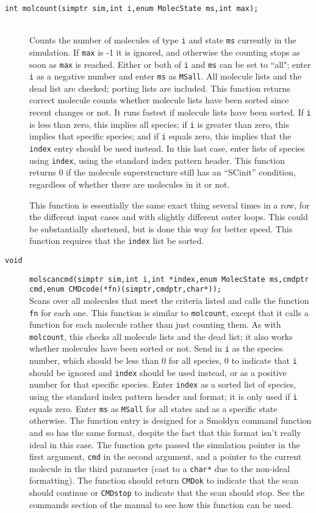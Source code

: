 \documentclass {scrbook}
\newcommand {\ttt} {\texttt}
\begin{document}
\begin{description}
\item[\ttt{int molcount(simptr sim,int i,enum MolecState ms,int max);}]
\hfill \\
Counts the number of molecules of type \ttt{i} and state \ttt{ms} currently in the simulation. If \ttt{max} is -1 it is ignored, and otherwise the counting stops as soon as \ttt{max} is reached. Either or both of \ttt{i} and \ttt{ms} can be set to ``all"; enter \ttt{i} as a negative number and enter \ttt{ms} as \ttt{MSall}. All molecule lists and the dead list are checked; porting lists are included. This function returns correct molecule counts whether molecule lists have been sorted since recent changes or not. It runs fastest if molecule lists have been sorted. If \ttt{i} is less than zero, this implies all species; if \ttt{i} is greater than zero, this implies that specific species; and if \ttt{i} equals zero, this implies that the \ttt{index} entry should be used instead. In this last case, enter lists of species using \ttt{index}, using the standard index pattern header. This function returns 0 if the molecule superstructure still has an ``SCinit'' condition, regardless of whether there are molecules in it or not.

This function is essentially the same exact thing several times in a row, for the different input cases and with slightly different outer loops. This could be substantially shortened, but is done this way for better speed. This function requires that the \ttt{index} list be sorted.

\item[\ttt{void}]
\ttt{molscancmd(simptr sim,int i,int *index,enum MolecState ms,cmdptr cmd,enum CMDcode(*fn)(simptr,cmdptr,char*));}
\hfill \\
Scans over all molecules that meet the criteria listed and calls the function \ttt{fn} for each one. This function is similar to \ttt{molcount}, except that it calls a function for each molecule rather than just counting them. As with \ttt{molcount}, this checks all molecule lists and the dead list; it also works whether molecules have been sorted or not. Send in \ttt{i} as the species number, which should be less than 0 for all species, 0 to indicate that \ttt{i} should be ignored and \ttt{index} should be used instead, or as a positive number for that specific species. Enter \ttt{index} as a sorted list of species, using the standard index pattern header and format; it is only used if \ttt{i} equals zero. Enter \ttt{ms} as \ttt{MSall} for all states and as a specific state otherwise. The function entry is designed for a Smoldyn command function and so has the same format, despite the fact that this format isn't really ideal in this case. The function gets passed the simulation pointer in the first argument, \ttt{cmd} in the second argument, and a pointer to the current molecule in the third parameter (cast to a \ttt{char*} due to the non-ideal formatting). The function should return \ttt{CMDok} to indicate that the scan should continue or \ttt{CMDstop} to indicate that the scan should stop. See the commands section of the manual to see how this function can be used.


\end{description}
\end{document}
